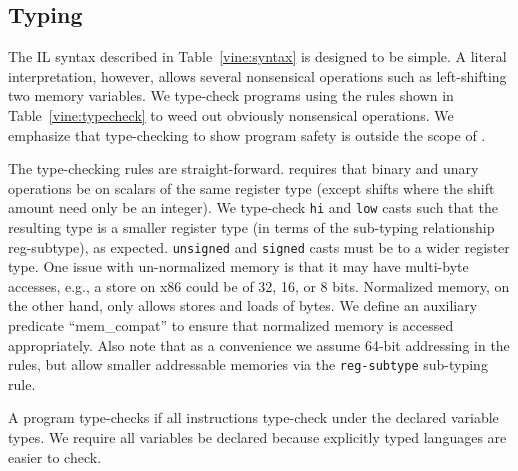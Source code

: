 \subsection{\bap Typing}
\label{vinesec:typecheck}


The \bap IL syntax described in Table~\ref{vine:syntax} is designed
to be simple. A literal interpretation, however, allows several
nonsensical operations such as left-shifting two memory variables.  We
type-check \bap programs using the  rules shown in
Table~\ref{vine:typecheck} to weed out obviously nonsensical
operations.  We emphasize that type-checking to show program safety is outside
the scope of \bap.

The type-checking rules are straight-forward.  \bap requires that
binary and unary operations be on scalars of the same register type
(except shifts where the shift amount need only be an integer). We
type-check {\tt hi} and {\tt low} casts such that the resulting type
is a smaller register type (in terms of the sub-typing relationship
{\sc reg-subtype}), as expected.  {\tt unsigned} and {\tt signed}
casts must be to a wider register type. One issue with un-normalized
memory is that it may have multi-byte accesses, e.g., a store on x86
could be of 32, 16, or 8 bits. Normalized memory, on the other hand,
only allows stores and loads of bytes.  We define an auxiliary
predicate ``mem\_compat'' to ensure that normalized memory is accessed
appropriately.  Also note that as a convenience we assume 64-bit
addressing in the rules, but allow smaller addressable memories via
the {\tt reg-subtype} sub-typing rule.

A program type-checks if all instructions type-check under the
declared variable types.  We require all variables be declared because
explicitly typed languages are easier to check. 

